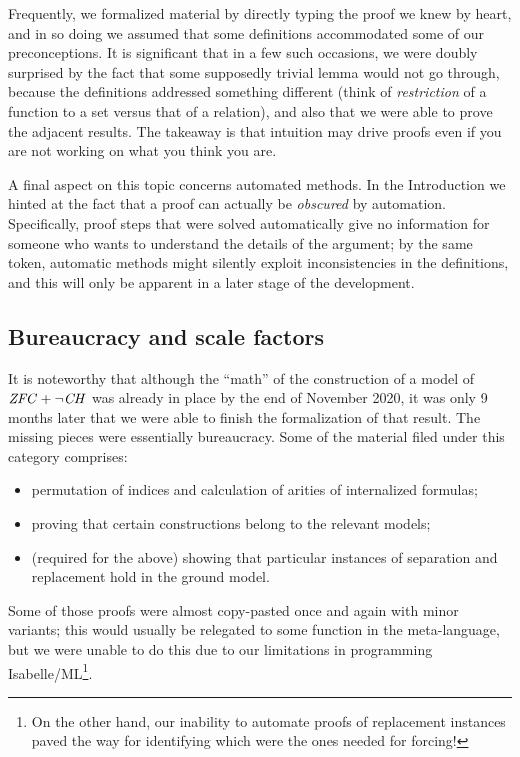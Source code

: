 Frequently, we formalized material by directly typing the proof we
knew by heart, and in so doing we assumed that some definitions
accommodated some of our preconceptions.
It is significant that in a few such occasions, we were doubly
surprised by the fact that some supposedly trivial lemma would not go
through, because the definitions addressed something different (think
of \emph{restriction} of a function to a set versus that of a
relation), and also that we were able to prove the adjacent
results. The takeaway is that intuition may drive proofs
even if you are not working on what you think you are.

A final aspect on this topic concerns automated methods. In the
Introduction we hinted at the fact that a proof can actually be
\emph{obscured} by automation. Specifically, proof steps that were solved automatically give no
information for someone who wants to understand the details of the
argument; by the same token, automatic methods might silently exploit
inconsistencies in the definitions, and this will only be apparent in
a later stage of the development.


\subsection{Bureaucracy and scale factors}
\label{sec:bureaucracy-scale-factors}

It is noteworthy that although the “math” of the construction of a
model of $\mathit{ZFC}+\neg\mathit{CH}$ was already in place by the end of November
2020, it was only 9 months later that we were able to finish the
formalization of that result. The missing pieces were essentially
bureaucracy. Some of the material filed under this category comprises:
\begin{itemize}
\item permutation of indices and calculation of arities of
  internalized formulas;
\item proving that certain constructions belong to the relevant
  models;
\item (required for the above) showing that particular instances of
  separation and replacement hold in the ground model.
\end{itemize}

Some of those proofs were almost copy-pasted once and again with minor
variants; this would usually be relegated to some function in the
meta-language, but we were unable to do this due to our limitations in
programming Isabelle/ML\footnote{%
  On the other hand, our inability to automate proofs of replacement
  instances paved the way for identifying which were the ones needed for
  forcing!}.

